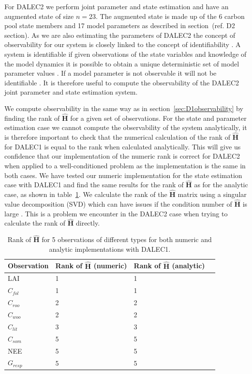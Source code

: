 \documentclass[11pt]{article}
\begin{document}
For DALEC2 we perform joint parameter and state estimation and have an augmented state of size $n = 23$. The augmented state is made up of the 6 carbon pool state members and 17 model parameters as described in section~({\color{red}ref. D2 section}). As we are also estimating the parameters of DALEC2 the concept of observability for our system is closely linked to the concept of identifiability \citep{navon1998practical}. A system is identifiable if given observations of the state variables and knowledge of the model dynamics it is possible to obtain a unique deterministic set of model parameter values \citep{ljung1998system}. If a model parameter is not observable it will not be identifiable \citep{Jacquez1985}. It is therefore useful to compute the observability of the DALEC2 joint parameter and state estimation system.

We compute observability in the same way as in section~\ref{sec:D1observability} by finding the rank of $\hat{\textbf{H}}$ for a given set of observations. For the state and parameter estimation case we cannot compute the observability of the system analytically, it is therefore important to check that the numerical calculation of the rank of $\hat{\textbf{H}}$ for DALEC1 is equal to the rank when calculated analytically. This will give us confidence that our implementation of the numeric rank is correct for DALEC2 when applied to a well-conditioned problem as the implementation is the same in both cases. We have tested our numeric implementation for the state estimation case with DALEC1 and find the same results for the rank of $\hat{\textbf{H}}$ as for the analytic case, as shown in table~\ref{table: a_n_h_D1}. We calculate the rank of the $\hat{\textbf{H}}$ matrix using a singular value decomposition (SVD) which can have issues if the condition number of $\hat{\textbf{H}}$ is large \citep{Paige1981}. This is a problem we encounter in the DALEC2 case when trying to calculate the rank of $\hat{\textbf{H}}$ directly.  

\begin{table}[ht] 
\begin{center}
	\begin{tabular}{| l | l | l | l}
	\hline
	Observation & Rank of $\hat{\textbf{H}}$ (numeric) & Rank of $\hat{\textbf{H}}$ (analytic) \\ \hline
	LAI & 1 & 1 \\ \hline
	$C_{fol}$ & 1 & 1  \\ \hline
	$C_{roo}$ & 2 & 2 \\ \hline
	$C_{woo}$ & 2 & 2 \\ \hline
	$C_{lit}$ & 3 & 3 \\ \hline
	$C_{som}$ & 5 & 5 \\ \hline
	NEE & 5 & 5 \\ \hline
	$G_{resp}$ & 5 & 5 \\  
	\hline
	\end{tabular}
	\caption{Rank of $\hat{\textbf{H}}$ for 5 observations of different types for both numeric and analytic implementations with DALEC1.}
	\label{table: a_n_h_D1}
\end{center} 
\end{table}
\end{document}
